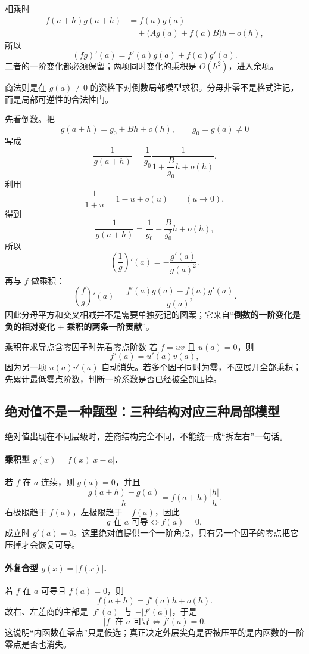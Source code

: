 \documentclass[11pt,a4paper]{ctexart}
\begin{document}
相乘时
\[
\begin{aligned}
f(a+h)g(a+h)
&=f(a)g(a)\\
&\quad+\bigl(A g(a)+f(a)B\bigr)h+o(h),
\end{aligned}
\]
所以
\[
(fg)'(a)=f'(a)g(a)+f(a)g'(a).
\]
二者的一阶变化都必须保留；两项同时变化的乘积是 $O(h^2)$，进入余项。

商法则是在 $g(a)\ne0$ 的资格下对倒数局部模型求积。分母非零不是格式注记，而是局部可逆性的合法性门。

先看倒数。把
\[
g(a+h)=g_0+Bh+o(h),\qquad g_0=g(a)\ne0
\]
写成
\[
\frac1{g(a+h)}
=\frac1{g_0}\frac1{1+\dfrac{B}{g_0}h+o(h)}.
\]
利用
\[
\frac1{1+u}=1-u+o(u)\qquad(u\to0),
\]
得到
\[
\frac1{g(a+h)}
=\frac1{g_0}-\frac{B}{g_0^2}h+o(h),
\]
所以
\[
\left(\frac1g\right)'(a)=-\frac{g'(a)}{g(a)^2}.
\]
再与 $f$ 做乘积：
\[
\boxed{\left(\frac fg\right)'(a)
=\frac{f'(a)g(a)-f(a)g'(a)}{g(a)^2}}.
\]
因此分母平方和交叉相减并不是需要单独死记的图案；它来自“\textbf{倒数的一阶变化是负的相对变化} + \textbf{乘积的两条一阶贡献}”。

\begin{methodbox}{乘积在求导点含零因子时先看零点阶数}
若 $f=uv$ 且 $u(a)=0$，则
\[
f'(a)=u'(a)v(a),
\]
因为另一项 $u(a)v'(a)$ 自动消失。若多个因子同时为零，不应展开全部乘积；先累计最低零点阶数，判断一阶系数是否已经被全部压掉。
\end{methodbox}

\subsection{绝对值不是一种题型：三种结构对应三种局部模型}

绝对值出现在不同层级时，差商结构完全不同，不能统一成“拆左右”一句话。

\paragraph{乘积型 $g(x)=f(x)\lvert x-a\rvert$.}
若 $f$ 在 $a$ 连续，则 $g(a)=0$，并且
\[
\frac{g(a+h)-g(a)}h=f(a+h)\frac{\lvert h\rvert}{h}.
\]
右极限趋于 $f(a)$，左极限趋于 $-f(a)$，因此
\[
\boxed{g\text{ 在 }a\text{ 可导}\iff f(a)=0},
\]
成立时 $g'(a)=0$。这里绝对值提供一个一阶角点，只有另一个因子的零点把它压掉才会恢复可导。

\paragraph{外复合型 $g(x)=\lvert f(x)\rvert$.}
若 $f$ 在 $a$ 可导且 $f(a)=0$，则
\[
f(a+h)=f'(a)h+o(h).
\]
故右、左差商的主部是 $\lvert f'(a)\rvert$ 与 $-\lvert f'(a)\rvert$，于是
\[
\boxed{\lvert f\rvert\text{ 在 }a\text{ 可导}\iff f'(a)=0}.
\]
这说明“内函数在零点”只是候选；真正决定外层尖角是否被压平的是内函数的一阶零点是否也消失。
\end{document}
